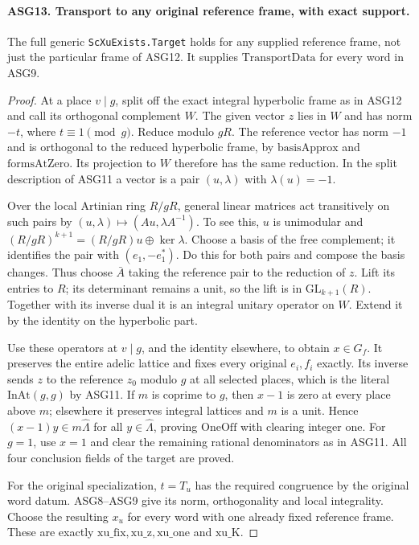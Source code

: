 \paragraph{ASG13. Transport to any original reference frame, with exact support.}
\label{claim:ASG13}
The full generic \texttt{ScXuExists.Target} holds for any supplied
reference frame, not just the particular frame of ASG12.
It supplies \(\mathrm{TransportData}\) for every word in ASG9.
\begin{proof}
At a place \(v\mid g\), split off the exact integral hyperbolic
frame as in ASG12 and call its orthogonal complement \(W\).
The given vector \(z\) lies in \(W\) and has norm \(-t\),
where \(t\equiv1\pmod g\).  Reduce modulo \(gR\).
The reference vector has norm \(-1\) and is orthogonal to the
reduced hyperbolic frame, by \(\mathrm{basisApprox}\) and
\(\mathrm{formsAtZero}\).  Its projection to \(W\) therefore
has the same reduction.  In the split description of ASG11 a vector
is a pair \((u,\lambda)\) with \(\lambda(u)=-1\).

Over the local Artinian ring \(R/gR\), general linear matrices act
transitively on such pairs by
\((u,\lambda)\mapsto(Au,\lambda A^{-1})\).
To see this, \(u\) is unimodular and
\((R/gR)^{k+1}=(R/gR)u\oplus\ker\lambda\).
Choose a basis of the free complement; it identifies the pair with
\((e_1,-e_1^*)\).  Do this for both pairs and compose the basis
changes.  Thus choose \(\bar A\) taking the reference pair to
the reduction of \(z\).  Lift its entries to \(R\); its
determinant remains a unit, so the lift is in \(\mathrm{GL}_{k+1}(R)\).
Together with its inverse dual it is an integral unitary operator
on \(W\).  Extend it by the identity on the hyperbolic part.

Use these operators at \(v\mid g\), and the identity elsewhere,
to obtain \(x\in G_f\).  It preserves the entire adelic lattice
and fixes every original \(e_i,f_i\) exactly.  Its inverse sends
\(z\) to the reference \(z_0\) modulo \(g\) at all selected
places, which is the literal \(\mathrm{InAt}(g,g)\) by ASG11.
If \(m\) is coprime to \(g\), then \(x-1\) is zero at
every place above \(m\); elsewhere it preserves integral lattices
and \(m\) is a unit.  Hence \((x-1)y\in m\widehat\Lambda\)
for all \(y\in\widehat\Lambda\), proving \(\mathrm{OneOff}\)
with clearing integer one.  For \(g=1\), use \(x=1\) and
clear the remaining rational denominators as in ASG11.
All four conclusion fields of the target are proved.

For the original specialization, \(t=T_u\) has the required
congruence by the original word datum.  ASG8--ASG9 give its norm,
orthogonality and local integrality.  Choose the resulting \(x_u\)
for every word with one already fixed reference frame.  These are
exactly \(\mathrm{xu\_fix},\mathrm{xu\_z},\mathrm{xu\_one}\)
and \(\mathrm{xu\_K}\).
\end{proof}

